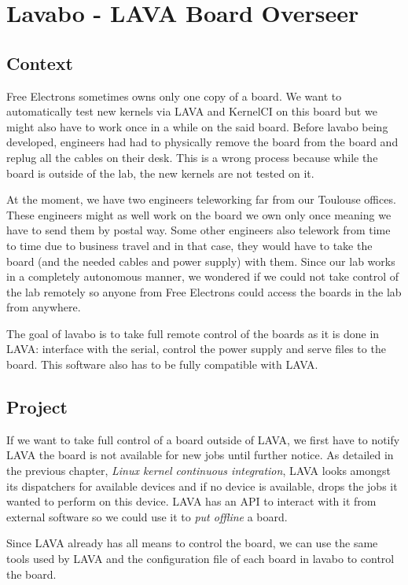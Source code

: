\chapter{Lavabo - LAVA Board Overseer}
\section{Context}

Free Electrons sometimes owns only one copy of a board. We want to automatically test new kernels via LAVA and KernelCI on this board but we might also have to work once in a while on the said board. Before lavabo being developed, engineers had had to physically remove the board from the board and replug all the cables on their desk. This is a wrong process because while the board is outside of the lab, the new kernels are not tested on it.

At the moment, we have two engineers teleworking far from our Toulouse offices. These engineers might as well work on the board we own only once meaning we have to send them by postal way. Some other engineers also telework from time to time due to business travel and in that case, they would have to take the board (and the needed cables and power supply) with them. Since our lab works in a completely autonomous manner, we wondered if we could not take control of the lab remotely so anyone from Free Electrons could access the boards in the lab from anywhere.

The goal of lavabo is to take full remote control of the boards as it is done in LAVA: interface with the serial, control the power supply and serve files to the board. This software also has to be fully compatible with LAVA.

\section{Project}

If we want to take full control of a board outside of LAVA, we first have to notify LAVA the board is not available for new jobs until further notice. As detailed in the previous chapter, \textit{Linux kernel continuous integration}, LAVA looks amongst its dispatchers for available devices and if no device is available, drops the jobs it wanted to perform on this device. LAVA has an API to interact with it from external software so we could use it to \textit{put offline} a board.

Since LAVA already has all means to control the board, we can use the same tools used by LAVA and the configuration file of each board in lavabo to control the board.

